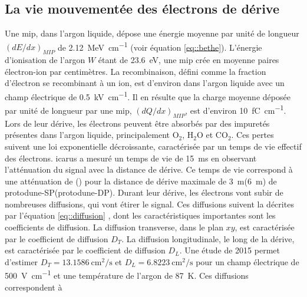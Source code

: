     \subsection{La vie mouvementée des électrons de dérive}
        Une \gls{mip}, dans l'argon liquide, dépose une énergie moyenne par unité de longueur $(dE/dx)_{MIP}$ de \SI{2.12}{\mega\electronvolt\per\centi\meter} (voir équation \eqref{eq::bethe}). L'énergie d'ionisation de l'argon $W$ étant de \SI{23.6}{\eV}, une \gls{mip} crée en moyenne  paires électron-ion par centimètres.
        La recombinaison, défini comme la fraction d'électron se recombinant à un ion, est d'environ  dans l'argon liquide avec un champ électrique de \SI{0.5}{\kilo\volt\per\centi\meter}. Il en résulte que la charge moyenne déposée par unité de longueur par une \gls{mip}, $(dQ/dx)_{MIP}$, est d'environ \SI{10}{\femto\coulomb\per\centi\meter}.  Lors de leur dérive, les électrons peuvent être absorbés par des impuretés présentes dans l'argon liquide, principalement O$_2$, H$_2$O et CO$_2$. Ces pertes suivent une loi exponentielle décroissante, caractérisée par un temps de vie effectif des électrons. \gls{icarus} a mesuré un temps de vie de \SI{15}{\milli\second}\cite{Antonello2014} en observant l'atténuation du signal avec la distance de dérive. Ce temps de vie correspond à une atténuation de () pour la distance de dérive maximale de \SI{3}{\meter}(\SI{6}{\meter}) de proto\gls{dune}-SP(proto\gls{dune}-DP). Durant leur dérive, les électrons vont subir de nombreuses diffusions, qui vont étirer le signal. Ces diffusions suivent la décrites par l'équation \eqref{eq::diffusion} , dont les caractéristiques importantes sont les coefficients de diffusion. La diffusion transverse, dans le plan $xy$, est caractérisée par le coefficient de diffusion $D_T$. La diffusion longitudinale, le long de la dérive, est caractérisée par le coefficient de diffusion $D_L$. Une étude de 2015\cite{Li2015} permet d'estimer $D_T=\SI{13.1586}{\centi\meter\squared\per\second}$ et $D_L=\SI{6.8223}{\centi\meter\squared\per\second}$ pour un champ électrique de \SI{500}{\volt\per\centi\meter} et une température de l'argon de \SI{87}{\kelvin}. Ces diffusions correspondent à
